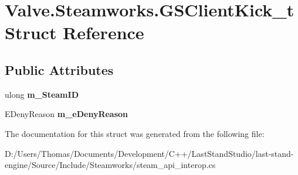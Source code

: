 \hypertarget{structValve_1_1Steamworks_1_1GSClientKick__t}{}\section{Valve.\+Steamworks.\+G\+S\+Client\+Kick\+\_\+t Struct Reference}
\label{structValve_1_1Steamworks_1_1GSClientKick__t}
\subsection*{Public Attributes}
\begin{DoxyCompactItemize}
\item 
\hypertarget{structValve_1_1Steamworks_1_1GSClientKick__t_ac231de16ef18e7569c499f967295a241}{}ulong {\bfseries m\+\_\+\+Steam\+I\+D}\label{structValve_1_1Steamworks_1_1GSClientKick__t_ac231de16ef18e7569c499f967295a241}

\item 
\hypertarget{structValve_1_1Steamworks_1_1GSClientKick__t_a4bf52120d5253114cb4985b4c55873c7}{}E\+Deny\+Reason {\bfseries m\+\_\+e\+Deny\+Reason}\label{structValve_1_1Steamworks_1_1GSClientKick__t_a4bf52120d5253114cb4985b4c55873c7}

\end{DoxyCompactItemize}


The documentation for this struct was generated from the following file\+:\begin{DoxyCompactItemize}
\item 
D\+:/\+Users/\+Thomas/\+Documents/\+Development/\+C++/\+Last\+Stand\+Studio/last-\/stand-\/engine/\+Source/\+Include/\+Steamworks/steam\+\_\+api\+\_\+interop.\+cs\end{DoxyCompactItemize}

